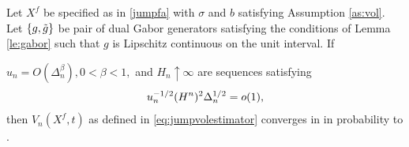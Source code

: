 \begin{lem}\label{lem:finite}
  Let $X^f$ be specified as in \eqref{jumpfa} with $\sigma$ and $b$ satisfying Assumption \ref{as:vol}. Let $\{g, \tilde{g}\}$ be pair of dual Gabor generators satisfying the conditions of Lemma \eqref{le:gabor} such that $g$ is Lipschitz continuous on the unit interval. If 
  \begin{comment}
  \begin{enumerate}[label=\emph{(}\roman*\emph{)}]
    \item 
  the drift of $X$ satisfies with probability 1:
  \begin{align}
    \limsup_{\Delta_n \to 0} \frac{M^*}{(\Delta_n \log(1/\Delta_n))^{1/2}} \le  C< \infty, \notag
    \label{}
  \end{align}
where $M^* : = \sup_{1 \le i <n} \vert \int^{t_{i+1}}_{t_i} b(s) \D s\vert$;
\item the diffusion coefficient satisfies with probability 1:  $\int^1_0 \sigma^2(s) \D s < \infty$ and 
  \begin{align}
\limsup_{\Delta_n \to 0} \frac{S^*}{\Delta_n} \le B <\infty, \notag
    \label{}
  \end{align}
  where $S^* := \sup_{1 \le i <n} \vert \int^{t_{i+1}}_{t_i} \sigma^2(s) \D s\vert$;
  \end{enumerate}
  \end{comment}
 $u_n = O(\Delta_n^\beta), 0 <\beta <1,$ and $H_n \uparrow \infty$ are sequences satisfying  
\begin{align}
  u_n^{-1/2} (H^n)^2 \Delta_n^{1/2} = o(1),\notag
    \label{}
  \end{align}
  then
  $V_n(X^f, t)$ as defined in \eqref{eq:jumpvolestimator}  converges in \Ltwo in probability to \sv.
\end{lem}
